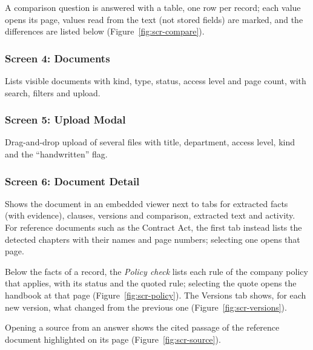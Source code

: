 A comparison question is answered with a table, one row per record; each value opens its page, values read
from the text (not stored fields) are marked, and the differences are listed below
(Figure~\ref{fig:scr-compare}).

\subsubsection{Screen 4: Documents}
Lists visible documents with kind, type, status, access level and page count, with search, filters and
upload.

\subsubsection{Screen 5: Upload Modal}
Drag-and-drop upload of several files with title, department, access level, kind and the
``handwritten'' flag.

\subsubsection{Screen 6: Document Detail}
Shows the document in an embedded viewer next to tabs for extracted facts (with evidence), clauses,
versions and comparison, extracted text and activity. For reference documents such as the Contract Act,
the first tab instead lists the detected chapters with their names and page numbers; selecting one opens
that page.

Below the facts of a record, the \emph{Policy check} lists each rule of the company policy that applies, with
its status and the quoted rule; selecting the quote opens the handbook at that page
(Figure~\ref{fig:scr-policy}). The Versions tab shows, for each new version, what changed from the previous
one (Figure~\ref{fig:scr-versions}).

Opening a source from an answer shows the cited passage of the reference document highlighted on its page
(Figure~\ref{fig:scr-source}).


